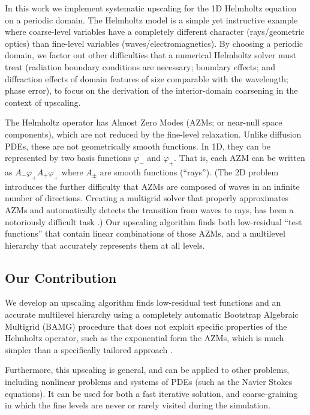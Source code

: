 \documentclass{article}
\begin{document}
In this work we implement systematic upscaling for the 1D Helmholtz equation on a periodic domain. The Helmholtz model is a simple yet instructive example where coarse-level variables have a completely different character (rays/geometric optics) than fine-level variables (waves/electromagnetics). By choosing a periodic domain, we factor out other difficulties that a numerical Helmholtz solver must treat (radiation boundary conditions are necessary; boundary effects; and diffraction effects of domain features of size comparable with the wavelength; phase error), to focus on the derivation of the interior-domain coarsening in the context of upscaling.

The Helmholtz operator has Almost Zero Modes (AZMs; or near-null space components), which are not reduced by the fine-level relaxation. Unlike diffusion PDEs, these are not geometrically smooth functions. In 1D, they can be represented by two basis functions $\varphi_-$ and $\varphi_+$. That is, each AZM can be written as $A_- \varphi_+ A_+ \varphi_+$ where $A_{\pm}$ are smooth functions (``rays''). (The 2D problem introduces the further difficulty that AZMs are composed of waves in an infinite number of directions. Creating a multigrid solver that properly approximates AZMs and automatically detects the transition from waves to rays, has been a notoriously difficult task \cite{wave_ray, later_papers}.) Our upscaling algorithm finds both low-residual ``test functions'' that contain linear combinations of those AZMs, and a multilevel hierarchy that accurately represents them at all levels.

\subsection{Our Contribution}
We develop an upscaling algorithm finds low-residual test functions and an accurate multilevel hierarchy using a completely automatic Bootstrap Algebraic Multigrid (BAMG) procedure that does not exploit specific properties of the Helmholtz operator, such as the exponential form the AZMs, which is much simpler than a specifically tailored approach  \cite{wave_ray, later_papers}.

Furthermore, this upscaling is general, and can be applied to other problems, including nonlinear problems and systems of PDEs (such as the Navier Stokes equations). It can be used for both a fast iterative solution, and coarse-graining in which the fine levels are never or rarely visited during the simulation.
\end{document}
